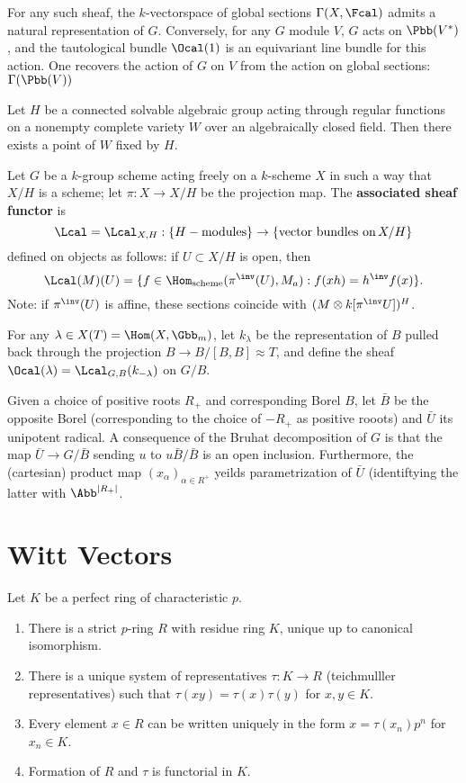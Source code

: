 \documentclass{amsart}
\begin{document}
For any such sheaf, the $k$-vectorspace of global sections $\Gamma(X,\Fcal)$ admits a natural representation of $G$. Conversely, for any $G$ module $V$, $G$ acts on $\Pbb(V^*)$, and the tautological bundle $\Ocal(1)$ is an equivariant line bundle for this action. One recovers the action of $G$ on $V$ from the action on global sections: $\Gamma(\Pbb(V))$

\begin{thm}
  Let $H$ be a connected solvable algebraic group acting through regular functions on a nonempty complete variety $W$ over an algebraically closed field. Then there exists a point of $W$ fixed by $H$.
\end{thm}

\begin{mydef}\label{def:associated-sheaf}
  Let $G$ be a $k$-group scheme acting freely on a $k$-scheme $X$ in such a way that $X/H$ is a scheme; let $\pi: X \to X/H$ be the projection map. The \textbf{associated sheaf functor} is
  \[ \Lcal=\Lcal_{X,H} : \{H -\text{modules}\} \to \{\text{vector bundles on} \, X/H\} \]
  defined on objects as follows: if $U \subset X/H$ is open, then
  \[\Lcal(M)(U) = \{ f \in \Hom_{\text{scheme}}(\pi^\inv (U), M_a) : f(xh) = h^\inv f(x)\}. \]
   Note: if $\pi^\inv(U)$ is affine, these sections coincide with $(M \otimes k[\pi^\inv U])^H$.
\end{mydef}


For any $\lambda \in X(T)=\Hom(X,\Gbb_m)$, let $k_\lambda$ be the representation of $B$ pulled back through the projection $B \to B/[B,B] \approx T$, and define the sheaf $\Ocal(\lambda) = \Lcal_{G,B}(k_{-\lambda})$ on $G/B$.

Given a choice of positive roots $R_+$ and corresponding Borel $B$, let $\bar{B}$ be the opposite Borel (corresponding to the choice of $-R_+$ as positive rooots) and $\bar{U}$ its unipotent radical. A consequence of the Bruhat decomposition of $G$ is that the map $\bar{U} \to G / \bar{B}$ sending $u$ to $u\bar{B}/\bar{B}$ is an open inclusion. Furthermore, the (cartesian) product map $(x_\alpha)_{\alpha \in R^+}$ yeilds parametrization of $\bar{U}$ (identiftying the latter with $\Abb^{|R_+|}$.


\section{Witt Vectors}
\begin{thm}
Let $K$ be a perfect ring of characteristic $p$.
\begin{enumerate}
        \item There is a strict $p$-ring $R$ with residue ring $K$, unique up to canonical isomorphism.
        \item There is a unique system of representatives $\tau : K \to R$ (teichmulller representatives) such that $\tau(xy)=\tau(x)\tau(y)$ for $x,y\in K$.
        \item Every element $x \in  R$ can be written uniquely in the form $x = \tau(x_n) p^n$ for $x_n \in K$.
        \item Formation of $R$ and $\tau$ is functorial in $K$.
\end{enumerate}
\end{thm}
\end{document}
